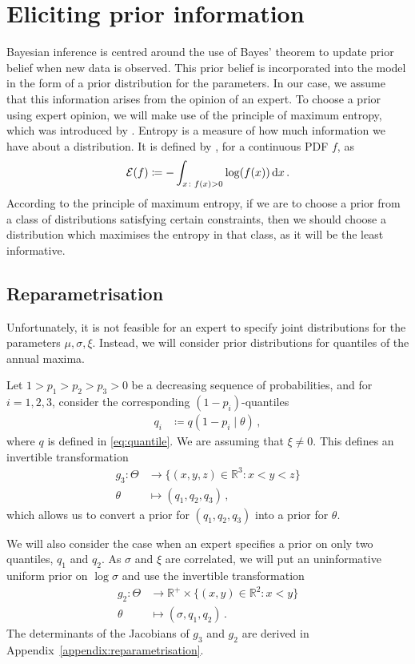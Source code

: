 \documentclass{article}
\newcommand{\R}{\mathbb{R}}
\newcommand{\dd}{{\rm d}}
\begin{document}
\section{Eliciting prior information}
\label{section:priors}
%
Bayesian inference is centred around the use of Bayes' theorem
to update prior belief when new data is observed.
This prior belief is incorporated
into the model in the form of a prior distribution for the parameters.
In our case, we assume that this information
arises from the opinion of an expert.
To choose a prior using expert opinion, we will make use of
the principle of maximum entropy,
which was introduced by \cite{jaynes1957}.
Entropy is a measure of how much information we have about a distribution.
It is defined by \cite{shannon1948},
for a continuous PDF $f$, as
%
\begin{align*}
	{\cal E}(f) \coloneqq -\int_{x \colon f(x) > 0} \log(f(x)) \, \dd x \,.
\end{align*}
%
According to the principle of maximum entropy,
if we are to choose a prior from a class of distributions satisfying
certain constraints,
then we should choose a distribution which
maximises the entropy in that class,
as it will be the least informative.
%
\subsection{Reparametrisation}
%
Unfortunately, it is not feasible for an
expert to specify joint distributions
for the parameters $\mu, \sigma, \xi$.
Instead, we will consider prior distributions
for quantiles of the annual maxima.
%

%
Let $1 > p_1 > p_2 > p_3 > 0$ be a decreasing sequence of probabilities,
and for $i = 1, 2, 3$, consider the corresponding $(1 - p_i)$-quantiles
%
\begin{align*}
	q_i &\coloneqq q(1 - p_i \mid \theta) \,,
\end{align*}
%
where $q$ is defined in \eqref{eq:quantile}.
We are assuming that $\xi \neq 0$.
This defines an invertible transformation
%
\begin{align*}
	g_3 \colon \Theta &\to \{(x, y, z) \in \R^3 \colon x < y < z\} \\
	\theta &\mapsto (q_{1}, q_{2}, q_{3}) \,,
\end{align*}
%
which allows us to convert a prior for $(q_1, q_2, q_3)$
into a prior for $\theta$.
%

%
We will also consider the case when an expert specifies a prior
on only two quantiles, $q_1$ and $q_2$.
As $\sigma$ and $\xi$ are correlated,
we will put an uninformative uniform prior on $\log \sigma$
and use the invertible transformation
%
\begin{align*}
	g_2 \colon \Theta &\to \R^+ \times \{(x, y) \in \R^2 \colon x < y\} \\
	\theta &\mapsto (\sigma, q_{1}, q_{2}) \,.
\end{align*}
%
The determinants of the Jacobians of $g_3$ and $g_2$ are derived in
Appendix~\ref{appendix:reparametrisation}.
%
\end{document}
